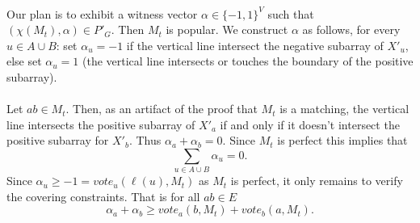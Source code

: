 \documentclass[letterpaper,12pt,oneside,onecolumn]{article}
\begin{document}
\paragraph{}
Our plan is to exhibit a witness vector $\alpha \in \{-1,1\}^V$ such that $(\chi(M_t), \alpha) \in P'_G$. Then $M_t$ is popular. We construct $\alpha$ as follows, for every $u \in A\cup B$: set $\alpha_u = -1$  if the vertical line intersect the negative subarray of $X'_u$, else set $\alpha_u = 1$ (the vertical line intersects or touches the boundary of the positive subarray).
\paragraph{}
Let $ab \in M_t$. Then, as an artifact of the proof that $M_t$ is a matching, the vertical line intersects the positive subarray of $X'_a$ if and only if it doesn't intersect the positive subarray for $X'_b$. Thus $\alpha_a + \alpha_b = 0$. Since $M_t$ is perfect this implies that
$$\sum_{u \in A\cup B} \alpha_u = 0.$$
Since $\alpha_u \geq -1 = vote_u(\ell(u), M_t)$ as $M_t$ is perfect, it only remains to verify the covering constraints. That is for all $ab \in E$
$$\alpha_a + \alpha_b \geq vote_a(b,M_t) + vote_b(a,M_t).$$
\end{document}
